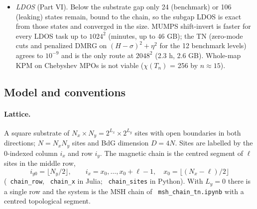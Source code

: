 \documentclass[11pt]{article}
\renewcommand{\code}[1]{\texttt{\hyphenchar\font=-1 #1}}
\begin{document}
\begin{itemize}
  faster than the sparse reference at $512^2$. At the leaking point the readouts need little bond dimension ($\chi_{\max} = 128$: $1-F\approx10^{-6}$),
  but the sparse reference stays faster up to $512^2$. TDVP needs about 2 GB at every size.
\item \emph{LDOS} (Part VI). Below the substrate gap only 24 (benchmark) or 106 (leaking) states remain, bound to the chain, so the subgap LDOS
  is exact from those states and converged in the size. MUMPS shift-invert is faster for every LDOS task up to $1024^2$ (minutes, up to 46 GB);
  the TN (zero-mode cuts and penalized DMRG on $(H-\sigma)^2+\eta^2$ for the 12 benchmark levels) agrees to $10^{-9}$ and is the only route at
  $2048^2$ (2.3 h, 2.6 GB). Whole-map KPM on Chebyshev MPOs is not viable ($\chi(T_n)$ = 256 by $n\approx15$).
\end{itemize}

\subsection{Model and conventions}\label{sec:model}

\paragraph{Lattice.} A square substrate of $N_x\times N_y = 2^{L_x}\times2^{L_y}$ sites with open boundaries in both directions;
$N = N_xN_y$ sites and BdG dimension $D = 4N$. Sites are labelled by the 0-indexed column $i_x$ and row $i_y$. The magnetic chain
is the centred segment of $\ell$ sites in the middle row,
\[
i_{y0} = \lfloor N_y/2\rfloor,\qquad i_x = x_0,\dots,x_0+\ell-1,\quad x_0 = \lfloor (N_x-\ell)/2\rfloor
\]
(\code{chain\_row}, \code{chain\_x} in Julia; \code{chain\_sites} in Python). With $L_y = 0$ there is a single row and the system is the
MSH chain of \code{msh\_chain\_tn.ipynb} with a centred topological segment.
\end{document}
